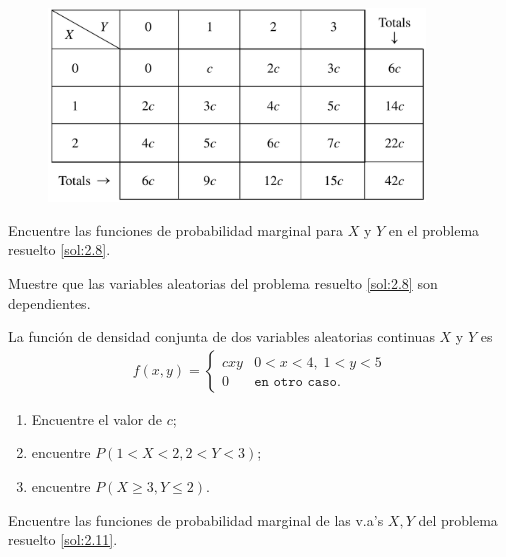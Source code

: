  \begin{figure}
 \centering
 \includegraphics[width=10cm,keepaspectratio=true]{./pe/tab0206.png}
 \label{tab:2.6}
\end{figure}



 \begin{ejemplo}
  \label{sol:2.9}
  Encuentre las funciones de probabilidad marginal para $X$ y $Y$ en el problema resuelto \ref{sol:2.8}.
 \end{ejemplo}



 \begin{ejemplo}
  \label{sol:2.10}
  Muestre que las variables aleatorias del problema resuelto \ref{sol:2.8} son dependientes.
 \end{ejemplo}



 \begin{ejemplo}
  \label{sol:2.11}
  La función de densidad conjunta de dos variables aleatorias continuas $X$ y $Y$ es
  \begin{align}
   f(x,y)=
   \begin{cases}
    cxy & 0<x<4, \; 1<y<5\\
    0 & \texttt{en otro caso}.
   \end{cases}
  \end{align}

 \end{ejemplo}
\begin{enumerate}
 \item Encuentre el valor de $c$;
 \item encuentre $P(1<X<2,2<Y<3)$;
 \item encuentre $P(X\geq 3, Y\leq 2)$.
\end{enumerate}



 \begin{ejemplo}
  \label{sol:2.12}
  Encuentre las funciones de probabilidad marginal de las v.a's $X,Y$ del problema resuelto \ref{sol:2.11}.
 \end{ejemplo}



